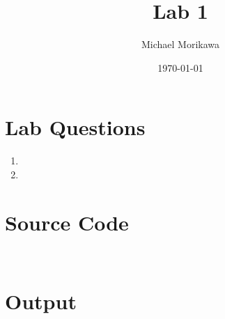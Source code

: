 \documentclass{article}
\title{Lab 1}
\author{Michael Morikawa}
\date{\today}
\begin{document}
    \maketitle
    \section{Lab Questions}
    \begin{enumerate}[label=\textbf{Question \arabic*}]
        \item 
        \item 
    \end{enumerate}

    \section{Source Code}
    \begin{verbatim}
        
    \end{verbatim}

    \section{Output}
\end{document}
